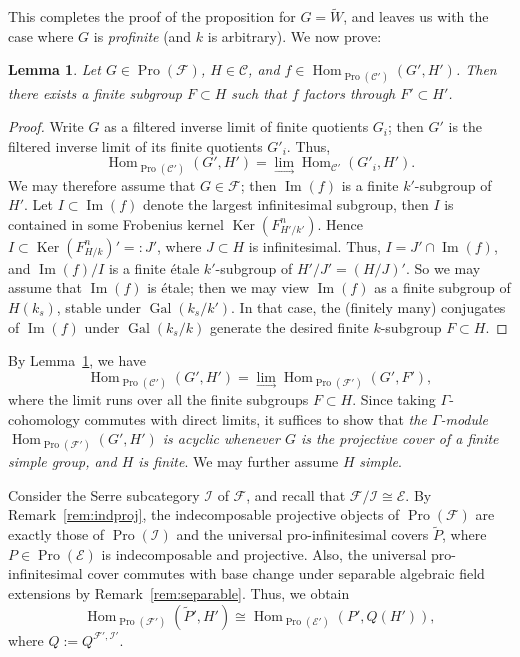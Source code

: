 \documentclass[11pt]{article}
\newtheorem{lemm}[theo]{Lemma}
\theoremstyle{definition}
\numberwithin{equation}{section}
\newcommand\cC{{\mathcal C}}
\newcommand\cE{{\mathcal E}}
\newcommand\cF{{\mathcal F}}
\newcommand\cI{{\mathcal I}}
\newcommand\tP{{\widetilde P}}
\newcommand\tW{{\widetilde W}}
\DeclareMathOperator{\Gal}{Gal}
\DeclareMathOperator{\Hom}{Hom}
\DeclareMathOperator{\Ker}{Ker}
\DeclareMathOperator{\Pro}{Pro}
\DeclareMathOperator{\Imop}{Im}
\renewcommand\Im{{\Imop}}
\theoremstyle{remark}
\begin{document}
This completes the proof of the proposition for $G = \tW$, and leaves us with the case where $G$ is \emph{profinite} (and $k$ is arbitrary). We now prove:


\begin{lemm}\label{lem:fin}
Let $G \in \Pro(\cF)$, $H \in \cC$, and $f \in \Hom_{\Pro(\cC')}(G',H')$. Then there exists a finite subgroup $F \subset H$ such that $f$ factors through $F' \subset H'$.
\end{lemm}


\begin{proof}
Write $G$ as a filtered inverse limit of finite quotients $G_i$; then $G'$ is the filtered inverse limit of its finite quotients $G'_i$. Thus,
\[
\Hom_{\Pro(\cC')}(G',H') =
\lim_{\to} \Hom_{\cC'}(G'_i,H').
\]
We may therefore assume that $G \in \cF$; then $\Im(f)$ is a finite $k'$-subgroup of $H'$. Let $I \subset \Im(f)$ denote the largest infinitesimal subgroup, then $I$ is contained in some Frobenius kernel $\Ker(F^n_{H'/k'})$. Hence $I \subset \Ker(F^n_{H/k})' =: J'$, where $J \subset H$ is infinitesimal. Thus, $I = J' \cap \Im(f)$, and $\Im(f)/I$ is a finite \'etale $k'$-subgroup of $H'/J' = (H/J)'$. So we may assume that $\Im(f)$ is \'etale; then we may view $\Im(f)$ as a finite subgroup of $H(k_s)$, stable under $\Gal(k_s/k')$. In that case, the (finitely many) conjugates of $\Im(f)$ under $\Gal(k_s/k)$ generate the desired finite $k$-subgroup $F \subset H$.
\end{proof}

By Lemma~\ref{lem:fin}, we have
\[
\Hom_{\Pro(\cC')}(G',H') =
\lim_{\to} \Hom_{\Pro(\cF')}(G',F'),
\]
where the limit runs over all the finite subgroups $F \subset H$. Since taking $\Gamma$-cohomology commutes with direct limits, it suffices to show that
\emph{the $\Gamma$-module $\Hom_{\Pro(\cF')}(G',H')$ is acyclic whenever $G$ is the projective cover of a finite simple group, and $H$ is finite}. We may further assume $H$ \emph{simple}.

Consider the Serre subcategory $\cI$ of $\cF$, and recall that $\cF/\cI \cong \cE$. By Remark~\ref{rem:indproj}, the indecomposable projective objects of $\Pro(\cF)$ are exactly those of $\Pro(\cI)$ and the universal pro-infinitesimal covers $\tP$, where $P \in \Pro(\cE)$ is indecomposable and projective. Also, the universal pro-infinitesimal cover commutes with base change under separable algebraic field extensions by Remark~\ref{rem:separable}. Thus, we obtain
\[
\Hom_{\Pro(\cF')}(\tP', H') \cong
\Hom_{\Pro(\cE')}(P', Q(H')),
\]
where $Q := Q^{\cF', \cI'}$.
\end{document}
